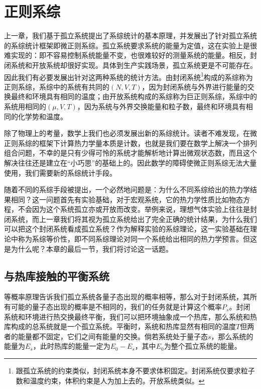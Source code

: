 \documentclass[../../main.tex]{subfiles}
\begin{document}
\chapter{正则系综}

上一章，我们基于孤立系统提出了系综统计的基本原理，并发展出了针对孤立系统的系综统计框架即微正则系综。孤立系统要求系统的能量为定值，这在实验上是很难实现的：即不容易控制系统能量不变，也很难较好的测量系统的能量。相反，封闭系统和开放系统却很好实现。具体到生产实践场景，孤立系统更是不可能存在。因此我们有必要发展出针对这两种系统的统计方法。由封闭系统\footnote{跟孤立系统的约束类似，封闭系统本身不要求体积固定。封闭系统仅要求粒子数和温度约束，体积约束是人为加上去的。开放系统类似。}构成的系综称为正则系综，系综中的系统有共同的\((N,V,T)\)，因为封闭系统与外界进行能量的交换最终和环境具有相同的温度；由开放系统构成的系综称为巨正则系综，系综中的系统用相同的\((\mu,V,T)\)，因为系统与外界交换能量和粒子数，最终和环境具有相同的化学势和温度。

除了物理上的考量，数学上我们也必须发展出新的系综统计。读者不难发现，在微正则系综的框架下计算热力学量本质是计数，也就是我们要在数学上解决一个排列组合问题，不幸的是只有少得可怜的系统才能解析地计算出微观状态数，而且这个解决往往还是建立在“小巧思”的基础上的。因此数学的障碍使微正则系综无法大量使用，我们需要新的系综统计手段。

随着不同的系综手段被提出，一个必然地问题是：为什么不同系综给出的热力学结果相同？这一问题首先有实验基础，对于宏观系统，它的热力学性质比如物态方程，不会因为这个系统孤立亦或开放而改变。举例来说，理想气体实验上往往是封闭系统，而上一章我们将其视为孤立系统给出了完全正确的统计结果，为什么我们可以把这个封闭系统看成孤立系统？作为解释实验的系综理论，这一实验基础在理论中称为系综等价性，即不同系综理论对同一个系统给出相同的热力学预言。但这是为什么呢？本章的最后一节，我们将讨论这一话题。

\section{与热库接触的平衡系统}

等概率原理告诉我们孤立系统各量子态出现的概率相等，那么对于封闭系统，其所有可能的量子态出现的概率是不相同的，我们的任务就是计算这个概率\(P_s\)。封闭系统和环境进行热交换最终平衡，我们可以把环境抽象成一个热库，那么系统和热库构成的总系统就是一个孤立系统。平衡时，系统和热库显然有相同的温度\(T\)但两者的能量都不固定，它们之间有能量的交换。倘若系统处于量子态\(s\)，那么系统的能量为\(E_s\)，此时热库的能量一定为\(E_0-E_s\)，其中\(E_0\)为整个孤立系统的能量。
\end{document}
